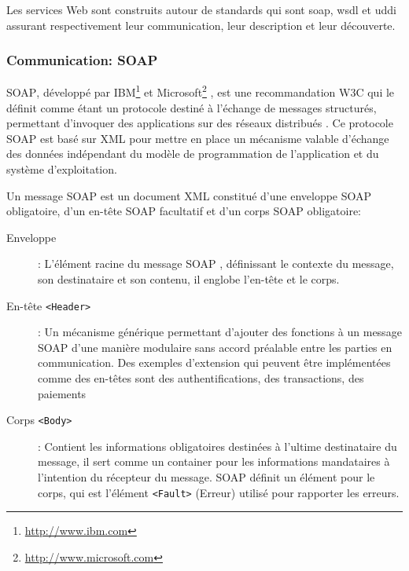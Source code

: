     Les services Web sont construits autour de standards qui sont
    \acrshort{soap}, \acrshort{wsdl} et \acrshort{uddi} assurant
    respectivement leur communication, leur description et leur découverte.

      \subsubsection{Communication: SOAP}
      \textsc{SOAP}, développé par IBM\footnote{\url{http://www.ibm.com}} et
      Microsoft\footnote{\url{http://www.microsoft.com}}
      \cite{box2000simple}, est une recommandation \textsc{W3C} qui le
      définit comme étant un protocole destiné à l'échange de messages
      structurés, permettant d'invoquer des applications sur des réseaux
      distribués \cite{mitra2003soap}.   Ce
      protocole \textsc{SOAP} est basé sur \textsc{XML} pour mettre en place
      un mécanisme valable d'échange des données indépendant du modèle de
      programmation de l'application et du système d’exploitation.

      Un message \textsc{SOAP} est un document XML constitué d'une enveloppe
      \textsc{SOAP} obligatoire, d'un en-tête \textsc{SOAP} facultatif et
      d'un corps \textsc{SOAP} obligatoire:




      \SpecialItem
      \begin{description} %
      \item[Enveloppe]: L'élément racine du message \textsc{SOAP} ,
        définissant le contexte du message, son destinataire et son contenu,
        il englobe l'en-tête et le corps.
        
      \item[En-tête \texttt{<Header>}]: Un mécanisme générique permettant
        d'ajouter des fonctions à un message \textsc{SOAP} d'une manière
        modulaire sans accord préalable entre les parties en communication.
        Des exemples d'extension qui peuvent être implémentées comme des
        en-têtes sont des authentifications, des transactions, des paiements
        
      \item[Corps \texttt{<Body>}]: Contient les informations obligatoires
        destinées à l'ultime destinataire du message, il sert comme un
        container pour les informations mandataires à l'intention du
        récepteur du message.  \textsc{SOAP} définit un élément pour le
        corps, qui est l'élément \texttt{<Fault>} (Erreur) utilisé pour
        rapporter les erreurs.
      \end{description}

